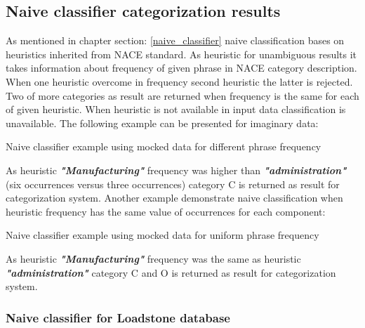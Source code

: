     
\subsection{Naive classifier categorization results}
As mentioned in chapter section: \ref{naive_classifier} naive classification bases on heuristics inherited from NACE standard. As heuristic for unambiguous results it takes information about frequency of given phrase in NACE category description. When one heuristic overcome in frequency second heuristic the latter is rejected. Two of more categories as result are returned when frequency is the same for each of given heuristic. When heuristic is not available in input data classification is unavailable. The following example can be presented for imaginary data:
\begin{algorithm}
	
	\hfill \break
	\caption{Naive classifier example using mocked data for different phrase frequency}
	\label{alg:3rd}
\end{algorithm}
\newline
As heuristic \textbf{\textit{"Manufacturing"}} frequency was higher than \textbf{\textit{"administration"}} (six occurrences versus three occurrences) category C is returned as result for categorization system.
\newline
Another example demonstrate naive classification when heuristic frequency has the same value of occurrences for each component:
\begin{algorithm}
	
	\hfill \break
	\caption{Naive classifier example using mocked data for uniform phrase frequency}
	\label{alg:4th}
\end{algorithm}
\newline  
As heuristic \textbf{\textit{"Manufacturing"}} frequency was the same as heuristic \textbf{\textit{"administration"}} category C and O is returned as result for categorization system.

\subsubsection{Naive classifier for Loadstone database}


